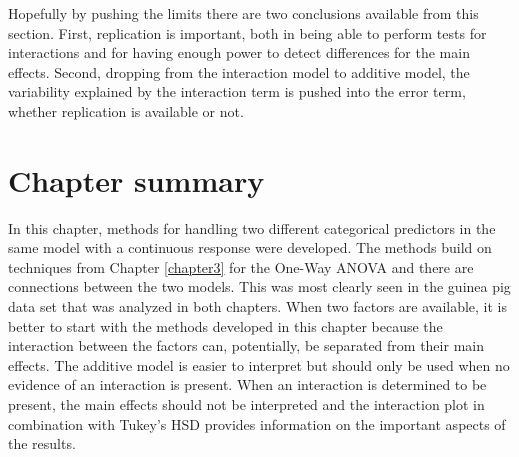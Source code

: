 \documentclass[]{book}
\theoremstyle{definition}
\theoremstyle{definition}
\theoremstyle{remark}
\begin{document}
Hopefully by pushing the limits there are two conclusions available from
this section. First, replication is important, both in being able to
perform tests for interactions and for having enough power to detect
differences for the main effects. Second, dropping from the interaction
model to additive model, the variability explained by the interaction
term is pushed into the error term, whether replication is available or
not.

\section{Chapter summary}\label{section4-7}

In this chapter, methods for handling two different categorical
predictors in the same model with a continuous response were developed.
The methods build on techniques from Chapter \ref{chapter3} for the
One-Way ANOVA and there are connections between the two models. This was
most clearly seen in the guinea pig data set that was analyzed in both
chapters. When two factors are available, it is better to start with the
methods developed in this chapter because the interaction between the
factors can, potentially, be separated from their main effects. The
additive model is easier to interpret but should only be used when no
evidence of an interaction is present. When an interaction is determined
to be present, the main effects should not be interpreted and the
interaction plot in combination with Tukey's HSD provides information on
the important aspects of the results.
\end{document}
